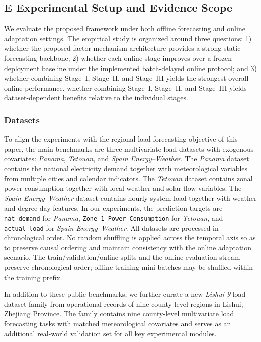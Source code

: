 ﻿\documentclass[journal]{IEEEtran}
\DeclareRobustCommand{\oldtext}[1]{{\color{revisionred}#1}}
\DeclareRobustCommand{\newtext}[1]{{\color{revisionblue}#1}}
\DeclareRobustCommand{\why}[1]{{\color{revisionblue}{\footnotesize (#1)}}}
\DeclareRobustCommand{\rw}[3]{\oldtext{#1} \newtext{#2}\why{#3}}
\begin{document}
\subsection{\rw{E}{Experimental Setup and Evidence Scope}{替换占位小节标题，并提示实验范围。}}
We evaluate the proposed framework under both offline forecasting and online adaptation settings. The empirical study is organized around three questions: 1) whether the proposed factor-mechanism architecture provides a strong static forecasting backbone; 2) whether each online stage improves over a frozen deployment baseline under the implemented batch-delayed online protocol; and 3) \rw{whether combining Stage~I, Stage~II, and Stage~III yields the strongest overall online performance.}{whether combining Stage~I, Stage~II, and Stage~III yields dataset-dependent benefits relative to the individual stages.}{避免预设 Full 一定最强。}

\subsubsection{Datasets}
To align the experiments with the regional load forecasting objective of this paper, the main benchmarks are three multivariate load datasets with exogenous covariates: \textit{Panama}, \textit{Tetouan}, and \textit{Spain Energy--Weather}. The \textit{Panama} dataset contains the national electricity demand together with meteorological variables from multiple cities and calendar indicators. The \textit{Tetouan} dataset contains zonal power consumption together with local weather and solar-flow variables. The \textit{Spain Energy--Weather} dataset contains hourly system load together with weather and degree-day features. In our experiments, the prediction targets are \texttt{nat\_demand} for \textit{Panama}, \texttt{Zone 1 Power Consumption} for \textit{Tetouan}, and \texttt{actual\_load} for \textit{Spain Energy--Weather}. All datasets are processed in chronological order. \rw{No random shuffling is applied across the temporal axis so as to preserve causal ordering and maintain consistency with the online adaptation scenario.}{The train/validation/online splits and the online evaluation stream preserve chronological order; offline training mini-batches may be shuffled within the training prefix.}{与代码中训练 DataLoader 可 shuffle 的事实一致。}

In addition to these public benchmarks, we further curate a new \textit{Lishui-9} load dataset family from operational records of nine county-level regions in Lishui, Zhejiang Province. The family contains nine county-level multivariate load forecasting tasks with matched meteorological covariates and serves as an additional real-world validation set for all key experimental modules.
\end{document}
